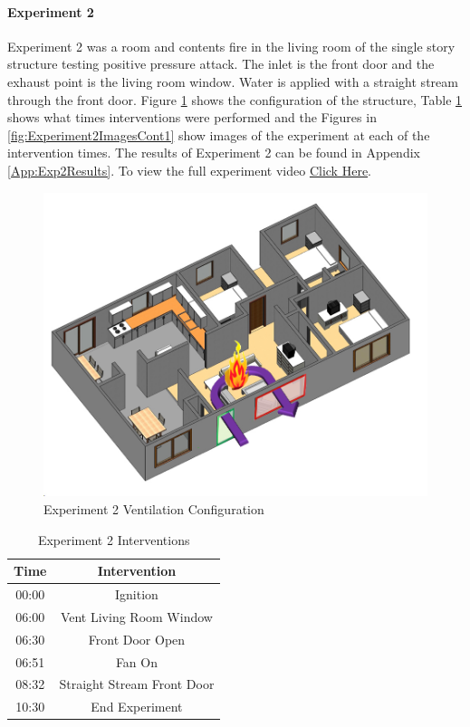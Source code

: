 \documentclass{article}
\begin{document}
\paragraph{Experiment 2}\mbox{}

Experiment 2 was a room and contents fire in the living room of the single story structure testing positive pressure attack. The inlet is the front door and the exhaust point is the living room window. Water is applied with a straight stream through the front door. Figure \ref{fig:Exp2VentConfig} shows the configuration of the structure, Table \ref{Table:Exp2Interventions} shows what times interventions were performed and the Figures in \ref{fig:Experiment2ImagesCont1} show images of the experiment at each of the intervention times. The results of Experiment 2 can be found in Appendix \ref{App:Exp2Results}. To view the full experiment video \href{https://youtu.be/B-GvQX4JoAc}{Click Here}.

\begin{figure}[H]
	\centering
	\includegraphics[width=5in]{0_Images/FireExperiments/Single_Story/Experiment_2.jpg}
	\caption{Experiment 2 Ventilation Configuration}
	\label{fig:Exp2VentConfig}
\end{figure}

\begin{table}[H]
	\centering
	\caption{Experiment 2 Interventions}
	\begin{tabular}{|c|c|} 
		\hline
		Time & Intervention \\ \hline \hline
		00:00 & Ignition \\ \hline
		06:00 & Vent Living Room Window\\ \hline
		06:30 & Front Door Open \\ \hline
		06:51 & Fan On \\ \hline
		08:32 & Straight Stream Front Door \\ \hline
		10:30 & End Experiment \\ \hline
	\end{tabular}
	\label{Table:Exp2Interventions}
\end{table}
\end{document}
